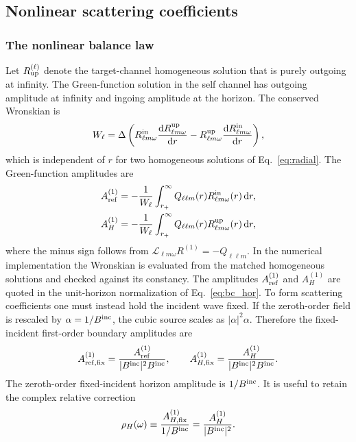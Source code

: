 \documentclass[aps,prd,twocolumn,10pt,nofootinbib,superscriptaddress,floatfix]{revtex4-2}
\newcommand{\dd}{\mathrm{d}}
\newcommand{\rp}{r_+}
\newcommand{\Bin}{B^{\rm inc}}
\newcommand{\Aref}{A_{\rm ref}^{(1)}}
\newcommand{\AH}{A_H^{(1)}}
\newcommand{\DeltaK}{\Delta}
\begin{document}
\subsection{Nonlinear scattering coefficients}

\subsubsection{The nonlinear balance law}

Let $R_{\rm up}^{(\ell)}$ denote the target-channel homogeneous solution that
is purely outgoing at infinity.  The Green-function solution in the self
channel has outgoing amplitude at infinity and ingoing amplitude at the
horizon.  The conserved Wronskian is
\begin{equation}
W_\ell=\DeltaK\left(
R^{\rm in}_{\ell m\omega}\frac{\dd R^{\rm up}_{\ell m\omega}}{\dd r}
-R^{\rm up}_{\ell m\omega}\frac{\dd R^{\rm in}_{\ell m\omega}}{\dd r}
\right),
\label{eq:wronskian}
\end{equation}
which is independent of $r$ for two homogeneous solutions of
Eq.~\eqref{eq:radial}.  The Green-function amplitudes are
\begin{align}
\Aref&=-\frac{1}{W_\ell}\int_{\rp}^{\infty}
Q_{\ell\ell m}(r)R^{\rm in}_{\ell m\omega}(r)\,\dd r,\\
\AH&=-\frac{1}{W_\ell}\int_{\rp}^{\infty}
Q_{\ell\ell m}(r)R^{\rm up}_{\ell m\omega}(r)\,\dd r ,
\end{align}
where the minus sign follows from
$\mathcal L_{\ell m\omega}R^{(1)}=-Q_{\ell\ell m}$.  In the numerical
implementation the Wronskian is evaluated from the matched homogeneous
solutions and checked against its constancy.  The amplitudes
$\Aref$ and $\AH$ are quoted in the unit-horizon normalization of
Eq.~\eqref{eq:bc_hor}.  To form scattering coefficients one must instead hold
the incident wave fixed.  If the zeroth-order field is rescaled by
$\alpha=1/\Bin$, the cubic source scales as $|\alpha|^2\alpha$.  Therefore the
fixed-incident first-order boundary amplitudes are
\begin{equation}
A_{{\rm ref},{\rm fix}}^{(1)}=\frac{\Aref}{|\Bin|^2\Bin},\qquad
A_{H,{\rm fix}}^{(1)}=\frac{\AH}{|\Bin|^2\Bin}.
\label{eq:fixed_incident_amplitudes}
\end{equation}
The zeroth-order fixed-incident horizon amplitude is $1/\Bin$.  It is useful
to retain the complex relative correction
\begin{equation}
 \rho_H(\omega)
 \equiv\frac{A_{H,{\rm fix}}^{(1)}}{1/\Bin}
 =\frac{\AH}{|\Bin|^2}.
 \label{eq:complex_horizon_response}
\end{equation}
\end{document}
